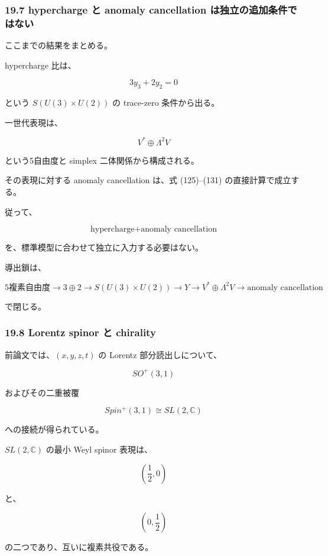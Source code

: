 \documentclass[
  a4paper,
]{ltjsarticle}
\begin{document}
\subsubsection{19.7 hypercharge と anomaly cancellation
は独立の追加条件ではない}\label{hypercharge-ux3068-anomaly-cancellation-ux306fux72ecux7acbux306eux8ffdux52a0ux6761ux4ef6ux3067ux306fux306aux3044}

ここまでの結果をまとめる。

hypercharge 比は、

\[
\boxed{
3y_3+2y_2=0
}
\]

という \(S(U(3)\times U(2))\) の trace-zero 条件から出る。

一世代表現は、

\[
\boxed{
V^*\oplus\Lambda^2V
}
\]

という5自由度と simplex 二体関係から構成される。

その表現に対する anomaly cancellation は、式 (125)--(131)
の直接計算で成立する。

従って、

\[
\boxed{
\text{hypercharge}
+
\text{anomaly cancellation}
}
\tag{133}
\]

を、標準模型に合わせて独立に入力する必要はない。

導出鎖は、

\[
\boxed{
5\text{複素自由度}
\to
3\oplus2
\to
S(U(3)\times U(2))
\to
Y
\to
V^*\oplus\Lambda^2V
\to
\text{anomaly cancellation}
}
\tag{134}
\]

で閉じる。

\subsubsection{19.8 Lorentz spinor と
chirality}\label{lorentz-spinor-ux3068-chirality}

前論文では、\((x,y,z,t)\) の Lorentz 部分読出しについて、

\[
SO^+(3,1)
\]

およびその二重被覆

\[
\boxed{
Spin^+(3,1)
\cong
SL(2,\mathbb C)
}
\tag{135}
\]

への接続が得られている。

\(SL(2,\mathbb C)\) の最小 Weyl spinor 表現は、

\[
\boxed{
\left(\frac12,0\right)
}
\tag{136}
\]

と、

\[
\boxed{
\left(0,\frac12\right)
}
\tag{137}
\]

の二つであり、互いに複素共役である。
\end{document}

